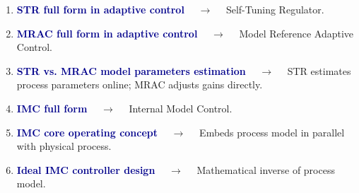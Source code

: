 \documentclass[11pt,a4paper]{article}
\begin{document}
\begin{enumerate}[label=\arabic*., leftmargin=*, labelsep=0.8em, itemsep=0.35em, parsep=0.1em, topsep=0.2em]
  \item \textcolor{darkblue}{\textbf{STR full form in adaptive control}} $\quad\to\quad$ Self-Tuning Regulator.
  \item \textcolor{darkblue}{\textbf{MRAC full form in adaptive control}} $\quad\to\quad$ Model Reference Adaptive Control.
  \item \textcolor{darkblue}{\textbf{STR vs. MRAC model parameters estimation}} $\quad\to\quad$ STR estimates process parameters online; MRAC adjusts gains directly.
  \item \textcolor{darkblue}{\textbf{IMC full form}} $\quad\to\quad$ Internal Model Control.
  \item \textcolor{darkblue}{\textbf{IMC core operating concept}} $\quad\to\quad$ Embeds process model in parallel with physical process.
  \item \textcolor{darkblue}{\textbf{Ideal IMC controller design}} $\quad\to\quad$ Mathematical inverse of process model.
\end{enumerate}
\end{document}
